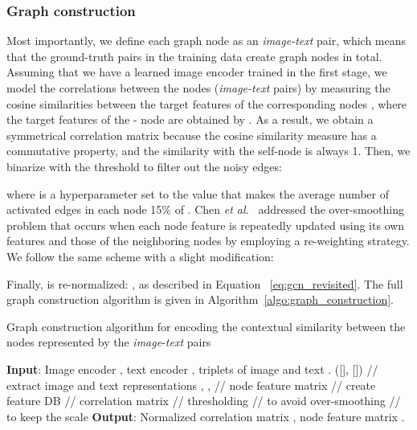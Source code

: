\documentclass[10pt,twocolumn,letterpaper]{article}
\begin{document}
\subsubsection{Graph construction}
Most importantly, we define each graph node as an \textit{image-text} pair, which means that the  ground-truth pairs in the training data create  graph nodes in total. Assuming that we have a learned image encoder  trained in the first stage, we model the correlations between the nodes (\textit{image-text} pairs) by measuring the cosine similarities between the target features of the corresponding nodes , where the target features of the - node are obtained by . As a result, we obtain a symmetrical correlation matrix  because the cosine similarity measure has a commutative property, and the similarity with the self-node is always 1. Then, we binarize  with the threshold  to filter out the noisy edges:

where  is a hyperparameter set to the value that makes the average number of activated edges in each node 15\% of . Chen \textit{et al.}~\cite{chen2019multi} addressed the over-smoothing problem that occurs when each node feature is repeatedly updated using its own features and those of the neighboring nodes by employing a re-weighting strategy. We follow the same scheme with a slight modification:


Finally,  is re-normalized: , as described in Equation~ \ref{eq:gcn_revisited}.
The full graph construction algorithm is given in Algorithm~\ref{algo:graph_construction}.

\begin{algorithm}
	\caption{Graph construction algorithm for encoding the contextual similarity between the nodes represented by the \textit{image}-\textit{text} pairs} 
	\begin{algorithmic}[1]
	    \State \textbf{Input}: Image encoder , text encoder ,  triplets of image and text .
	    \State  ([], [])
	        \State \textcolor{light-gray}{// extract image and text representations}
	        \State , , 
	        \State  \textcolor{light-gray}{// node feature matrix}      
	        \State  \textcolor{light-gray}{// create feature DB}
	    \EndFor
	    \State  \textcolor{light-gray}{// correlation matrix}
	    \State  \textcolor{light-gray}{// thresholding}
	    \State  \textcolor{light-gray}{// to avoid over-smoothing}
	    \State  \textcolor{light-gray}{// to keep the scale}
	    \State \textbf{Output}: Normalized correlation matrix , node feature matrix .
	\end{algorithmic}
	\label{algo:graph_construction}
\end{algorithm}
\end{document}
